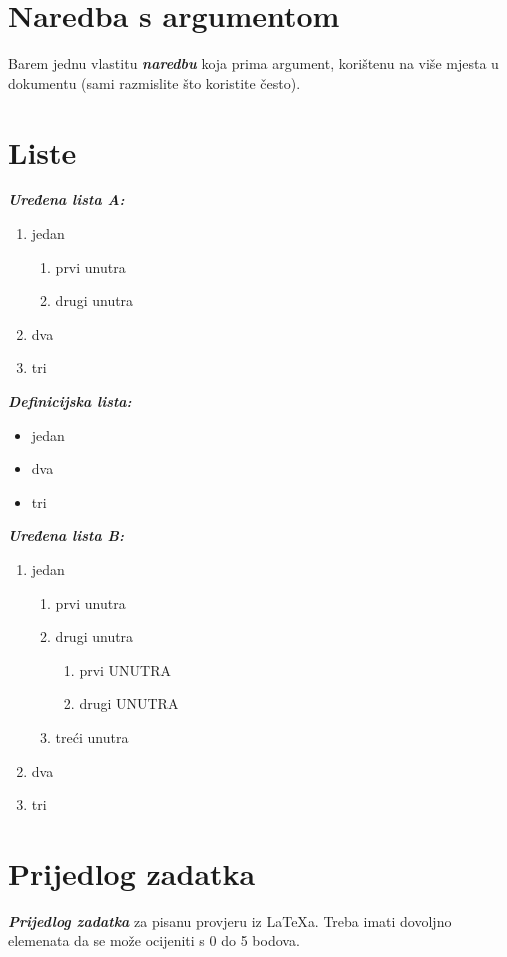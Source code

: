 \documentclass[12pt]{scrartcl}
\newcommand{\BI}[1]{\textbf{\textit{#1}}}
\begin{document}
\section{Naredba s argumentom}
Barem jednu vlastitu \BI{naredbu} koja prima argument, korištenu na više mjesta u dokumentu (sami razmislite što koristite često).

\section{Liste}
\BI{Uređena lista A:}
\begin{enumerate}
    \item jedan
    \begin{enumerate}
        \item prvi unutra
        \item drugi unutra
    \end{enumerate}
    \item dva
    \item tri
\end{enumerate}
\BI{Definicijska lista:}
\begin{itemize}
    \item jedan
    \item dva
    \item tri
\end{itemize}
\BI{Uređena lista B:}
\begin{enumerate}
    \item jedan
    \begin{enumerate}
        \item prvi unutra
        \item drugi unutra
        \begin{enumerate}
            \item prvi UNUTRA
            \item drugi UNUTRA
        \end{enumerate}
        \item treći unutra
    \end{enumerate}
    \item dva
    \item tri
\end{enumerate}

\section{Prijedlog zadatka}
\BI{Prijedlog zadatka} za pisanu provjeru iz {\LaTeX}a. Treba imati dovoljno elemenata da se može ocijeniti s 0 do 5 bodova.
\end{document}
